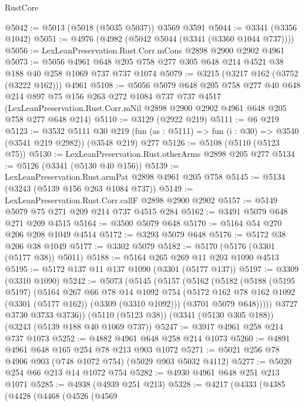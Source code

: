 \begin{lexlean}{RustCore}
\begin{coremodule}
@5042 := @5013 (@5018 (@5035 @5037)) @3569 @3591
@5044 := @3341 (@3356 @1042)
@5051 := @4976 (@4982 (@5042 @5044 (@3341 (@3360 @1044 @737))))
@5056 := LexLeanPreservation.Rust.Corr.mCons @2898 @2900 @2902 @4961
@5073 := @5056
    @4961
    @648
    @205
    @758
    @277
    @305
    @648
    @214
    @4521
    @38
    @188
    @40
    @258
    @1069
    @737
    @737
    @1074
@5079 := @3215 (@3217 @162 (@3752 (@3222 @162))) @4961
@5108 := @5056
    @5079
    @648
    @205
    @758
    @277
    @40
    @648
    @214
    @897
    @75
    @156
    @263
    @272
    @1084
    @737
    @737
    @4517
    (LexLeanPreservation.Rust.Corr.mNil @2898 @2900 @2902 @4961 @648 @205 @758 @277 @648 @214)
@5110 := @3129 (@2922 @219)
@5111 := @6 @219
@5123 := @3532
    @5111
    @30
    @219
    (fun (as : @5111) => fun (i : @30) => @3540 (@3541 @219 @2982))
    (@3548 @219)
    @277
@5126 := @5108 (@5110 (@5123 @75))
@5130 := LexLeanPreservation.Rust.otherArms @2898 @205 @277
@5134 := @5126 (@3341 (@5130 @40 @156))
@5139 := LexLeanPreservation.Rust.armPat @2898 @4961 @205 @758
@5145 := @5134 (@3243 (@5139 @156 @263 @1084 @737))
@5149 := LexLeanPreservation.Rust.Corr.callF @2898 @2900 @2902
@5157 := @5149 @5079 @75 @271 @209 @214 @737 @4515 @284
@5162 := @3491 @5079 @648 @271 @209 @4515
@5164 := @3500 @5079 @648
@5170 := @5164 @54 @270 @206 @208 @1049 @4514
@5172 := @3293 @5079 @648
@5176 := @5172 @38 @206 @38 @1049
@5177 := @3302 @5079
@5182 := @5170 (@5176 (@3301 (@5177 @38)) @5011)
@5188 := @5164 @265 @269 @11 @203 @1090 @4513
@5195 := @5172 @137 @11 @137 @1090 (@3301 (@5177 @137))
@5197 := @3309 (@3310 @1090)
@5242 := @5073
    (@5145
      (@5157
        (@5162
          (@5182
            (@5188
              (@5195 @5197)
              (@5164
                @267
                @66
                @78
                @14
                @1092
                @754
                (@5172 @162 @78 @162 @1092 (@3301 (@5177 @162)) (@3309 (@3310 @1092)))
                (@3701 @5079 @648)))))
        @3727
        @3730
        @3733
        @3736))
    (@5110 (@5123 @38))
    (@3341 (@5130 @305 @188))
    (@3243 (@5139 @188 @40 @1069 @737))
@5247 := @3917 @4961 @258 @214 @737 @1073
@5252 := @4882 @4961 @648 @258 @214 @1073
@5260 := @4891 @4961 @648 @165 @254 @78 @213 @903 @1072
@5271 := @5021 @256 @78 @4906 @903 (@748 @1072 @754) (@5029 @903 @5032 @4112)
@5277 := @5020 @254 @66 @213 @14 @1072 @754
@5282 := @4930 @4961 @648 @251 @213 @1071
@5285 := @4938 (@4939 @251 @213)
@5328 := @4217
    (@4333
      (@4385
        (@4428
          (@4468
            (@4526
              (@4569

\end{coremodule}
\end{lexlean}
